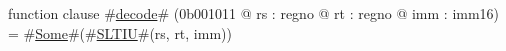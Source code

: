 function clause #\hyperref[zdecode]{decode}# (0b001011 @ rs : regno @ rt : regno @ imm : imm16) =
  #\hyperref[zSome]{Some}#(#\hyperref[zSLTIU]{SLTIU}#(rs, rt, imm))

